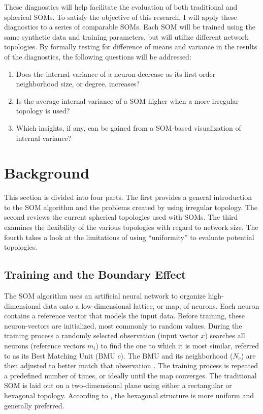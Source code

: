\documentclass[10pt,titlepage]{article}
\begin{document}
These diagnostics will help facilitate the evaluation of both traditional and
spherical SOMs.  To satisfy the objective of this research, I will apply these
diagnostics to a series of comparable SOMs.  Each SOM will be trained using the
same synthetic data and training parameters, but will utilize different network
topologies.  By formally testing for difference of means and variance in the
results of the diagnostics, the following questions will be addressed:

\begin{enumerate}
	\item Does the internal variance of a neuron decrease as its first-order neighborhood size, or degree, increases?
	\item Is the average internal variance of a SOM higher when a more irregular topology is used?
	\item Which insights, if any, can be gained from a SOM-based visualization of internal variance?
\end{enumerate}

\section{Background}
This section is divided into four parts.  The first provides a general
introduction to the SOM algorithm and the problems created by using irregular
topology. The second reviews the current spherical topologies used with SOMs.
The third examines the flexibility of the various topologies with regard to
network size. The fourth takes a look at the limitations of using ``uniformity''
to evaluate potential topologies.

\subsection{Training and the Boundary Effect}
The SOM algorithm uses an artificial neural network to organize high-dimensional
data onto a low-dimensional lattice, or map, of neurons.  Each neuron contains a
reference vector that models the input data.  Before training, these
neuron-vectors are initialized, most commonly to random values.  During the
training process a randomly selected observation (input vector $x$) searches
all neurons (reference vectors $m_i$) to find the one to which it is most
similar, referred to as its Best Matching Unit (BMU $c$).  The BMU and its
neighborhood ($N_c$) are then adjusted to better match that observation
\citep{Kohonen2000}.  The training process is repeated a predefined number of
times, or ideally until the map converges.  The traditional SOM is laid out on a
two-dimensional plane using either a rectangular or hexagonal topology.
According to \cite{wu2006}, the hexagonal structure is more uniform and generally
preferred.
\end{document}
